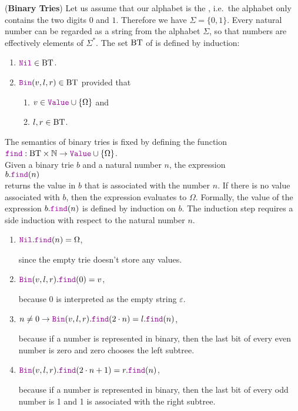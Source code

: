 \exercise
(\textbf{Binary Tries})  Let us assume that our alphabet is the , i.e.~the alphabet
only contains the two digits $0$ and $1$.  Therefore we have $\Sigma = \{0,1\}$.  Every natural
number can be regarded as a string from the alphabet $\Sigma$, so that numbers are effectively
elements of $\Sigma^*$.  The set $\mathrm{BT}$ of  is defined by induction:
\begin{enumerate}
\item $\mytt{Nil} \in \BT$.
\item $\mytt{Bin}(v,l,r) \in \BT$ provided that
      \begin{enumerate}
      \item $v \in \mytt{Value} \cup \{\Omega\}$ \quad and
      \item $l,r \in \mathrm{BT}$.
      \end{enumerate}
\end{enumerate}
The semantics of binary tries is fixed by defining the function
\\[0.2cm]
\hspace*{1.3cm}
$\mytt{find}: \BT \times \mathbb{N} \rightarrow \mytt{Value} \cup \{ \Omega \}$.
\\[0.2cm]
Given a binary trie $b$ and a natural number $n$, the expression
\\[0.2cm]
\hspace*{1.3cm}
$b.\mytt{find}(n)$ 
\\[0.2cm]
returns the value in $b$ that is associated with the number $n$.  If there is no value associated
with $b$, then the expression evaluates to $\Omega$.  Formally, the value of the expression
 $b.\mytt{find}(n)$ is defined by induction on $b$.  The induction step requires a side induction
 with respect to the natural number $n$.
\begin{enumerate}
\item $\mytt{Nil}.\mytt{find}(n) = \Omega$,

      since the empty trie doesn't store any values.
\item $\mytt{Bin}(v,l,r).\mytt{find}(0) = v$,

      because $0$ is interpreted as the empty string $\varepsilon$.
\item $n \not= 0 \rightarrow \mytt{Bin}(v,l,r).\mytt{find}(2\cdot n) = l.\mytt{find}(n)$,

      because if a number is represented in binary, then the last bit of every even number is zero
      and zero chooses the left subtree.
\item $\mytt{Bin}(v,l,r).\mytt{find}(2 \cdot n + 1) = r.\mytt{find}(n)$,

      because if a number is represented in binary, then the last bit of every odd number is 1 and 
      1 is associated with the right subtree.
\end{enumerate}
